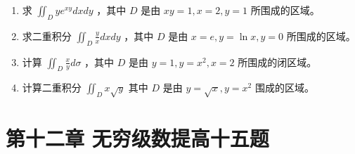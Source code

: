 \documentclass[12pt, a4paper]{article}
\begin{document}
\begin{enumerate}
    \item [11.] 求 $ \iint_{D} ye^{xy} dx dy $ ，其中 $D$ 是由 $ xy = 1, x = 2, y = 1 $ 所围成的区域。

    \item [12.] 求二重积分 $ \iint_{D}\frac{y}{x}dxdy $ ，其中 $D$ 是由 $ x=e,y=\ln x,y=0 $ 所围成的区域。

    \item [13.] 计算 $ \iint_{D} \frac{x}{y} d\sigma $ ，其中 $D$ 是由 $ y = 1, y = x^{2}, x = 2 $ 所围成的闭区域。

    \item [14.] 计算二重积分 $ \iint_{D} x\sqrt{y} $ 其中 $D$ 是由 $ y = \sqrt{x}, y = x^{2} $ 围成的区域。
\end{enumerate}

\section*{第十二章 无穷级数提高十五题}
\end{document}

